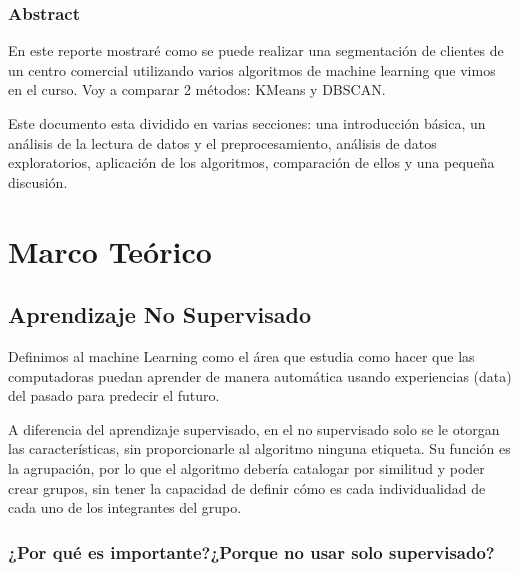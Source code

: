 \documentclass[12pt, fleqn]{report}                             %
\theoremstyle{break}                                            %
\begin{document}
\restoregeometry                                                    %
\nopagecolor                                                        %




\tableofcontents{}
\label{sec:Index}

\clearpage

\section*{Abstract}
En este reporte mostraré como se puede realizar una segmentación de clientes de 
un centro comercial utilizando varios algoritmos de machine learning que vimos en el 
curso. Voy a comparar 2 métodos: KMeans y DBSCAN.

Este documento esta dividido en varias secciones: una introducción básica, un análisis 
de la lectura de datos y el preprocesamiento, análisis de datos exploratorios, aplicación 
de los algoritmos, comparación de ellos y una pequeña discusión.


\part{Marco Teórico}
\clearpage

    \chapter{Aprendizaje No Supervisado}
        Definimos al machine Learning como el área que estudia como hacer que las computadoras puedan
        aprender de manera automática usando experiencias (data) del pasado para predecir el futuro.

        A diferencia del aprendizaje supervisado, en el no supervisado solo se le otorgan las características, 
        sin proporcionarle al algoritmo ninguna etiqueta. Su función es la agrupación, por lo que el algoritmo 
        debería catalogar por similitud y poder crear grupos, sin tener la capacidad de definir cómo es cada 
        individualidad de cada uno de los integrantes del grupo.
        
        \section{¿Por qué es importante?¿Porque no usar solo supervisado?}
        
\end{document}
